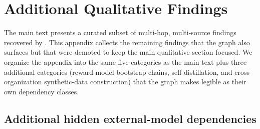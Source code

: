 
\section{Additional Qualitative Findings}\label{appendix:findings}

The main text presents a curated subset of multi-hop, multi-source findings recovered by \system{}. This appendix collects the remaining findings that the graph also surfaces but that were demoted to keep the main qualitative section focused. We organize the appendix into the same five categories as the main text plus three additional categories (reward-model bootstrap chains, self-distillation, and cross-organization synthetic-data construction) that the graph makes legible as their own dependency classes.

\subsection{Additional hidden external-model dependencies}

